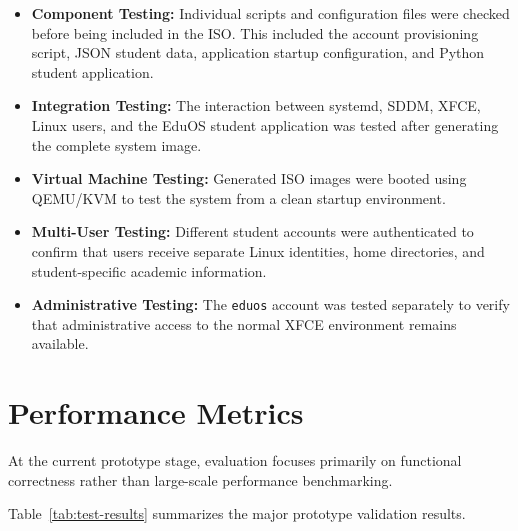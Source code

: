 \documentclass{tietreport}
\begin{document}
\begin{itemize}

    \item \textbf{Component Testing:}
    Individual scripts and configuration files were checked before
    being included in the ISO. This included the account provisioning
    script, JSON student data, application startup configuration, and
    Python student application.

    \item \textbf{Integration Testing:}
    The interaction between systemd, SDDM, XFCE, Linux users, and the
    EduOS student application was tested after generating the complete
    system image.

    \item \textbf{Virtual Machine Testing:}
    Generated ISO images were booted using QEMU/KVM to test the system
    from a clean startup environment.

    \item \textbf{Multi-User Testing:}
    Different student accounts were authenticated to confirm that
    users receive separate Linux identities, home directories, and
    student-specific academic information.

    \item \textbf{Administrative Testing:}
    The \texttt{eduos} account was tested separately to verify that
    administrative access to the normal XFCE environment remains
    available.

\end{itemize}


\section{Performance Metrics}

At the current prototype stage, evaluation focuses primarily on
functional correctness rather than large-scale performance
benchmarking.

Table~\ref{tab:test-results} summarizes the major prototype
validation results.
\end{document}
